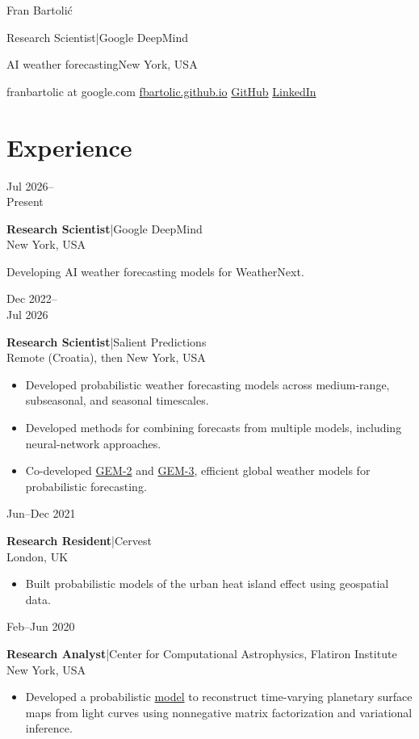 \documentclass[11pt,a4paper]{article}
\newcommand{\cvitem}[2]{%
  \par\noindent\begin{minipage}[t]{24mm}
    \raggedright\small\sffamily\leavevmode\color{muted}#1
  \end{minipage}\hfill\begin{minipage}[t]{\dimexpr\linewidth-28mm\relax}
    \raggedright #2
  \end{minipage}\par\vspace{4pt}}
\newcommand{\cventry}[6]{%
  \cvitem{#1}{\textbf{#2}\enspace|\enspace #3\\[-1pt]
    {\small\sffamily\color{muted}#4}\if\relax\detokenize{#5}\relax\else\enspace #5\fi
    \par\vspace{2pt}#6}}
\begin{document}
{\fontsize{30}{34}\selectfont Fran Bartoli\'{c}}\par
\vspace{5pt}
{\large\sffamily Research Scientist\enspace|\enspace Google DeepMind}\par
\vspace{3pt}
{\sffamily\color{muted}AI weather forecasting\enspace\textperiodcentered\enspace New York, USA}\par
\vspace{7pt}
{\small\sffamily
franbartolic at google.com\enspace\textperiodcentered\enspace
\href{https://fbartolic.github.io}{fbartolic.github.io}\enspace\textperiodcentered\enspace
\href{https://github.com/fbartolic}{GitHub}\enspace\textperiodcentered\enspace
\href{https://www.linkedin.com/in/fbartolic/}{LinkedIn}}\par
\vspace{3pt}

\section{Experience}
\cventry{Jul 2026--\\Present}{Research Scientist}{Google DeepMind}
{New York, USA}{}{Developing AI weather forecasting models for WeatherNext.}
\cventry{Dec 2022--\\Jul 2026}{Research Scientist}{Salient Predictions}
{Remote (Croatia), then New York, USA}{}{
    \begin{itemize}
        \item Developed probabilistic weather forecasting models across medium-range, subseasonal, and seasonal timescales.
        \item Developed methods for combining forecasts from multiple models, including neural-network approaches.
        \item Co-developed \href{https://arxiv.org/abs/2601.03753}{GEM-2} and \href{https://arxiv.org/abs/2608.06241}{GEM-3}, efficient global weather models for probabilistic forecasting.
    \end{itemize}}
\cventry{Jun--Dec 2021}{Research Resident}{Cervest}
{London, UK}{}{
    \begin{itemize}
        \item Built probabilistic models of the urban heat island effect using geospatial data.
    \end{itemize}}
\cventry{Feb--Jun 2020}{Research Analyst}{Center for Computational Astrophysics, Flatiron Institute}
{New York, USA}{}{
    \begin{itemize}
        \item Developed a probabilistic \href{https://speakerdeck.com/fbartolic/inferring-a-time-dependent-map-of-io-from-occultations-and-phase-curves}{model} to reconstruct time-varying planetary surface maps from light curves using nonnegative matrix factorization and variational inference.
    \end{itemize}}
\end{document}
